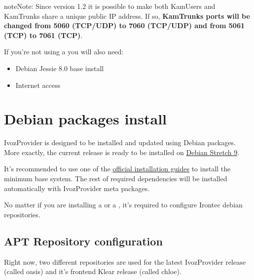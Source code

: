 \documentclass[letterpaper,10pt,english]{sphinxmanual}
\begin{document}
\begin{notice}{note}{Note:}
Since version 1.2 it is possible to make both KamUsers and KamTrunks
share a unique public IP address. If so, \textbf{KamTrunks ports will be changed
from 5060 (TCP/UDP) to 7060 (TCP/UDP) and from 5061 (TCP) to 7061 (TCP)}.
\end{notice}

If you're not using a {\hyperref[basics/installation/cd_install:automatic\string-iso\string-cd\string-image]{}} you will also need:
\begin{itemize}
\item {} 
Debian Jessie 8.0 base install

\item {} 
Internet access

\end{itemize}


\section{Debian packages install}
\label{basics/installation/debian_install::doc}\label{basics/installation/debian_install:debian-packages-install}
IvozProvider is designed to be installed and updated using Debian packages.
More exactly, the current release is ready to be installed on
\href{https://www.debian.org/releases/stretch}{Debian Stretch 9}.

It's recommended to use one of the \href{https://www.debian.org/releases/stretch/installmanual}{official installation guides} to install the minimum
base system. The rest of required  dependencies will be installed automatically
with IvozProvider meta packages.

No matter if you are installing a  {\hyperref[basics/installation/install_types:standalone\string-install]{}} or a
{\hyperref[basics/installation/install_types:distributed\string-install]{}}, it's required to configure Irontec debian
repositories.


\subsection{APT Repository configuration}
\label{basics/installation/debian_install:apt-repository-configuration}
Right now, two different repositories are used for the latest IvozProvider
release (called oasis) and it's frontend Klear release (called chloe).
\end{document}
